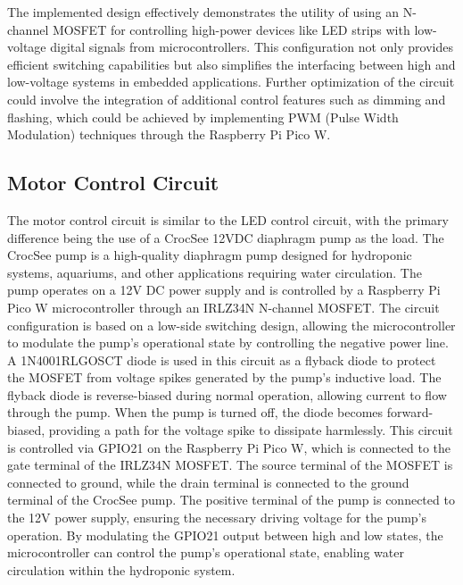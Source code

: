 \documentclass[12pt]{article} %
\begin{document}
\newline
\newline
The implemented design effectively demonstrates the utility of using an N-channel MOSFET for controlling high-power devices like LED strips with low-voltage digital signals from microcontrollers. This configuration not only provides efficient switching capabilities but also simplifies the interfacing between high and low-voltage systems in embedded applications. Further optimization of the circuit could involve the integration of additional control features such as dimming and flashing, which could be achieved by implementing PWM (Pulse Width Modulation) techniques through the Raspberry Pi Pico W.

\subsection{Motor Control Circuit}
\noindent The motor control circuit is similar to the LED control circuit, with the primary difference being the use of a CrocSee 12VDC diaphragm pump as the load. The CrocSee pump is a high-quality diaphragm pump designed for hydroponic systems, aquariums, and other applications requiring water circulation. The pump operates on a 12V DC power supply and is controlled by a Raspberry Pi Pico W microcontroller through an IRLZ34N N-channel MOSFET. The circuit configuration is based on a low-side switching design, allowing the microcontroller to modulate the pump's operational state by controlling the negative power line.
\newline
\newline
\noindent A 1N4001RLGOSCT diode \cite{ref_diode} is used in this circuit as a flyback diode to protect the MOSFET from voltage spikes generated by the pump's inductive load. The flyback diode is reverse-biased during normal operation, allowing current to flow through the pump. When the pump is turned off, the diode becomes forward-biased, providing a path for the voltage spike to dissipate harmlessly.
\newline
\newline
\noindent This circuit is controlled via GPIO21 on the Raspberry Pi Pico W, which is connected to the gate terminal of the IRLZ34N MOSFET. The source terminal of the MOSFET is connected to ground, while the drain terminal is connected to the ground terminal of the CrocSee pump. The positive terminal of the pump is connected to the 12V power supply, ensuring the necessary driving voltage for the pump's operation. By modulating the GPIO21 output between high and low states, the microcontroller can control the pump's operational state, enabling water circulation within the hydroponic system. 
\end{document}
